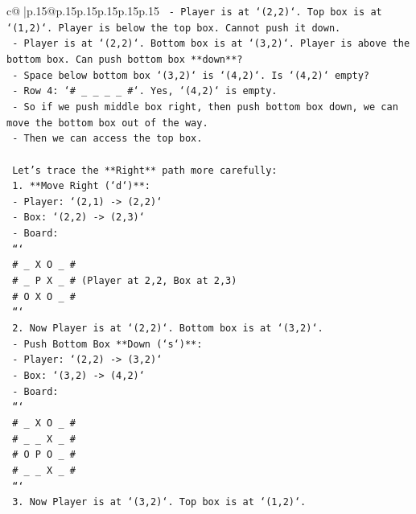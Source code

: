 \documentclass{article}
\begin{document}
{\begin{supertabular}{c@{$\;$}|p{.15\linewidth}@{}p{.15\linewidth}p{.15\linewidth}p{.15\linewidth}p{.15\linewidth}p{.15\linewidth}}
{{{\texttt{        {-} Player is at `(2,2)`. Top box is at `(1,2)`. Player is below the top box. Cannot push it down.} \\
\texttt{        {-} Player is at `(2,2)`. Bottom box is at `(3,2)`. Player is above the bottom box. Can push bottom box **down**?} \\
\texttt{        {-} Space below bottom box `(3,2)` is `(4,2)`. Is `(4,2)` empty?} \\
\texttt{        {-} Row 4: `\# \_ \_ \_ \_ \#`. Yes, `(4,2)` is empty.} \\
\texttt{        {-} So if we push middle box right, then push bottom box down, we can move the bottom box out of the way.} \\
\texttt{        {-} Then we can access the top box.} \\
\\ 
\texttt{    Let's trace the **Right** path more carefully:} \\
\texttt{    1. **Move Right (`d`)**:} \\
\texttt{       {-} Player: `(2,1) {-}> (2,2)`} \\
\texttt{       {-} Box: `(2,2) {-}> (2,3)`} \\
\texttt{       {-} Board:} \\
\texttt{         ```} \\
\texttt{         \# \_ X O \_ \#} \\
\texttt{         \# \_ P X \_ \#  (Player at 2,2, Box at 2,3)} \\
\texttt{         \# O X O \_ \#} \\
\texttt{         ```} \\
\texttt{    2. Now Player is at `(2,2)`. Bottom box is at `(3,2)`.} \\
\texttt{       {-} Push Bottom Box **Down (`s`)**:} \\
\texttt{       {-} Player: `(2,2) {-}> (3,2)`} \\
\texttt{       {-} Box: `(3,2) {-}> (4,2)`} \\
\texttt{       {-} Board:} \\
\texttt{         ```} \\
\texttt{         \# \_ X O \_ \#} \\
\texttt{         \# \_ \_ X \_ \#} \\
\texttt{         \# O P O \_ \#} \\
\texttt{         \# \_ \_ X \_ \#} \\
\texttt{         ```} \\
\texttt{    3. Now Player is at `(3,2)`. Top box is at `(1,2)`.} \\
}}}
\end{supertabular}}
\end{document}
